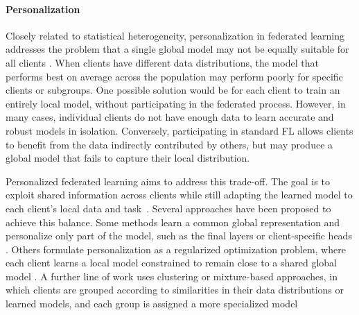 \paragraph{Personalization}
Closely related to statistical heterogeneity, personalization in federated learning addresses the problem that a single global model may not be equally suitable for all clients \cite{marfoq2021federated}. When clients have different data distributions, the model that performs best on average across the population may perform poorly for specific clients or subgroups. One possible solution would be for each client to train an entirely local model, without participating in the federated process. However, in many cases, individual clients do not have enough data to learn accurate and robust models in isolation. Conversely, participating in standard FL allows clients to benefit from the data indirectly contributed by others, but may produce a global model that fails to capture their local distribution.

Personalized federated learning aims to address this trade-off. The goal is to exploit shared information across clients while still adapting the learned model to each client's local data and task~\cite{kairouz_open_problems}. Several approaches have been proposed to achieve this balance. Some methods learn a common global representation and personalize only part of the model, such as the final layers or client-specific heads \cite{fedper, fedrep}. Others formulate personalization as a regularized optimization problem, where each client learns a local model constrained to remain close to a shared global model \cite{pfedme, ditto}. A further line of work uses clustering or mixture-based approaches, in which clients are grouped according to similarities in their data distributions or learned models, and each group is assigned a more specialized model \cite{marfoq2021federated, marfoq_memorization, fedGMM}
